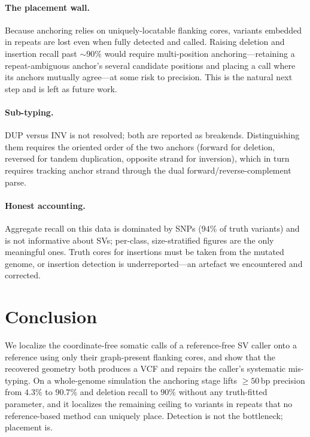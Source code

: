 \documentclass[11pt]{article}
\begin{document}
\paragraph{The placement wall.}
Because anchoring relies on uniquely-locatable flanking cores, variants embedded in repeats are
lost even when fully detected and called. Raising deletion and insertion recall past $\sim\!90\%$
would require multi-position anchoring---retaining a repeat-ambiguous anchor's several candidate
positions and placing a call where its anchors mutually agree---at some risk to precision. This is
the natural next step and is left as future work.

\paragraph{Sub-typing.}
DUP versus INV is not resolved; both are reported as breakends. Distinguishing them requires the
oriented order of the two anchors (forward for deletion, reversed for tandem duplication, opposite
strand for inversion), which in turn requires tracking anchor strand through the dual
forward/reverse-complement parse.

\paragraph{Honest accounting.}
Aggregate recall on this data is dominated by SNPs ($94\%$ of truth variants) and is not
informative about SVs; per-class, size-stratified figures are the only meaningful ones. Truth
cores for insertions must be taken from the mutated genome, or insertion detection is
underreported---an artefact we encountered and corrected.

\section{Conclusion}

We localize the coordinate-free somatic calls of a reference-free SV caller onto a reference using
only their graph-present flanking cores, and show that the recovered geometry both produces a VCF
and repairs the caller's systematic mis-typing. On a whole-genome simulation the anchoring stage
lifts $\geq 50$\,bp precision from $4.3\%$ to $90.7\%$ and deletion recall to $90\%$ without any
truth-fitted parameter, and it localizes the remaining ceiling to variants in repeats that no
reference-based method can uniquely place. Detection is not the bottleneck; placement is.
\end{document}
